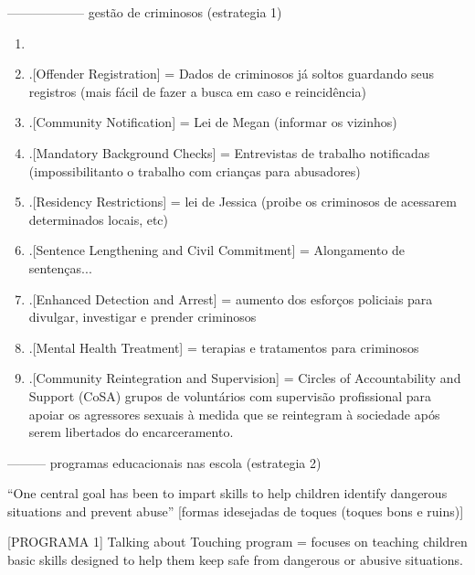 ------------------  gestão de criminosos (estrategia 1)

\begin{enumerate}
  \item \cite{finkelhor2009prevention}

\item .[Offender Registration] = Dados de criminosos já soltos guardando seus registros (mais fácil de fazer a busca em caso e reincidência)

\item .[Community Notification] = Lei de Megan (informar os vizinhos)

\item .[Mandatory Background Checks] = Entrevistas de trabalho notificadas (impossibilitanto o trabalho com crianças para abusadores)

\item .[Residency Restrictions] = lei de Jessica (proibe os criminosos de acessarem determinados locais, etc)

\item .[Sentence Lengthening and Civil Commitment] = Alongamento de sentenças...

\item .[Enhanced Detection and Arrest] = aumento dos esforços policiais para divulgar, investigar e prender criminosos

\item .[Mental Health Treatment] = terapias e tratamentos para criminosos

\item .[Community Reintegration and Supervision] = Circles of Accountability and Support (CoSA) grupos de voluntários com supervisão profissional para apoiar os agressores sexuais à medida que se reintegram à sociedade após serem libertados do encarceramento.
\end{enumerate}

--------- programas educacionais nas escola (estrategia 2)

``One central goal has been to impart skills to help children identify dangerous situations and prevent abuse'' \cite{finkelhor2009prevention} [formas idesejadas de toques (toques bons e ruins)]


[PROGRAMA 1] Talking about Touching program =  focuses on teaching children basic skills designed to help them keep safe from dangerous or abusive situations. \cite{finkelhor2009prevention} %



